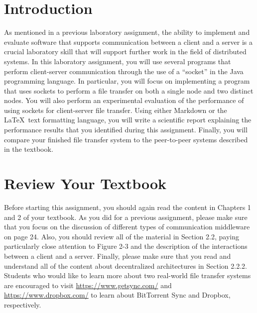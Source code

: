 


\usepackage[compact]{titlesec}



\section*{Introduction}

As mentioned in a previous laboratory assignment, the ability to implement and evaluate software that supports
communication between a client and a server is a crucial laboratory skill that will support further work in the field of
distributed systems. In this laboratory assignment, you will use several programs that perform client-server
communication through the use of a ``socket'' in the Java programming language. In particular, you will focus on
implementing a program that uses sockets to perform a file transfer on both a single node and two distinct nodes.  You
will also perform an experimental evaluation of the performance of using sockets for client-server file transfer.  Using
either Markdown or the \LaTeX~text formatting language, you will write a scientific report explaining the performance
results that you identified during this assignment. Finally, you will compare your finished file transfer
system to the peer-to-peer systems described in the textbook.

\section*{Review Your Textbook}

Before starting this assignment, you should again read the content in Chapters 1 and 2 of your textbook. As
you did for a previous assignment, please make sure that you focus on the discussion of different types of communication
middleware on page 24. Also, you should review all of the material in Section 2.2, paying particularly close attention
to Figure 2-3 and the description of the interactions between a client and a server. Finally, please make sure that you
read and understand all of the content about decentralized architectures in Section 2.2.2. Students who would like to
learn more about two real-world file transfer systems are encouraged to visit \url{https://www.getsync.com/} and
\url{https://www.dropbox.com/} to learn about BitTorrent Sync and Dropbox, respectively.

